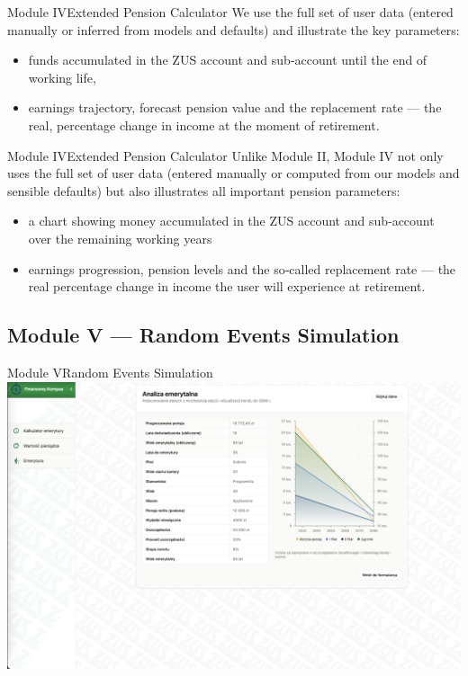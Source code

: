 \begin{frame}[t]{Module IV}{Extended Pension Calculator}
We use the full set of user data (entered manually or inferred from models and defaults)
and illustrate the key parameters:
\begin{itemize}
  \pause
  \item funds accumulated in the ZUS account and sub‑account until the end of working life,
  \pause
  \item earnings trajectory, forecast pension value and the replacement rate —
        the real, percentage change in income at the moment of retirement.
\end{itemize}
\end{frame}

\begin{frame}[t]{Module IV}{Extended Pension Calculator}
Unlike Module II, Module IV not only uses the full set of user data
(entered manually or computed from our models and sensible defaults)
but also illustrates all important pension parameters:

\begin{itemize}
    \pause
    \item a chart showing money accumulated in the ZUS account and sub‑account over the remaining working years
    \pause
    \item earnings progression, pension levels and the so‑called replacement rate — the real percentage change
    in income the user will experience at retirement.
\end{itemize}
\end{frame}

\subsection{Module V --- Random Events Simulation}

\begin{frame}[t]{Module V}{Random Events Simulation}
  \includegraphics[width=.8\textwidth]{img/module_4_extended_pension_calculator}
\end{frame}

